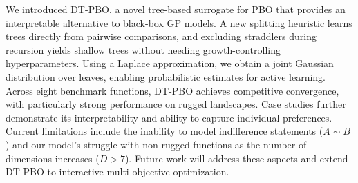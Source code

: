 \documentclass{article}
\begin{document}

We introduced DT-PBO, a novel tree-based surrogate for PBO that provides an interpretable alternative to black-box GP models. A new splitting heuristic learns trees directly from pairwise comparisons, and excluding straddlers during recursion yields shallow trees without needing growth-controlling hyperparameters. Using a Laplace approximation, we obtain a joint Gaussian distribution over leaves, enabling probabilistic estimates for active learning. Across eight benchmark functions, DT-PBO achieves competitive convergence, with particularly strong performance on rugged landscapes. Case studies further demonstrate its interpretability and ability to capture individual preferences. Current limitations include the inability to model indifference statements ($A \sim B$) and our model's struggle with non-rugged functions as the number of dimensions increases ($D > 7$). Future work will address these aspects and extend DT-PBO to interactive multi-objective optimization.
\end{document}
